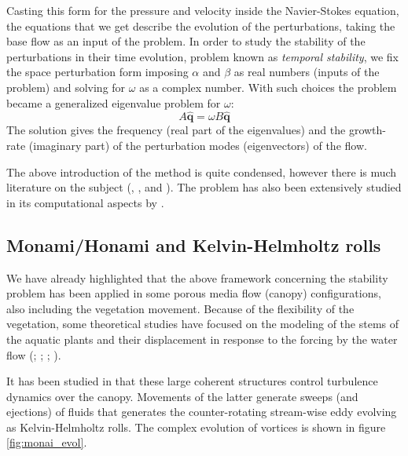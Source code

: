 Casting this form for the pressure and velocity inside the Navier-Stokes equation, the equations that we get describe the evolution of the perturbations, taking the base flow as an input of the problem.
In order to study the stability of the perturbations in their time evolution, problem known as \textit{temporal stability}, we fix the space perturbation form imposing $\alpha$ and $\beta$ as real numbers (inputs of the problem) and solving for $\omega$ as a complex number.
With such choices the problem became a generalized eigenvalue problem for $\omega$:
$$ A \widehat{\mathbf{q}} =  \omega B\widehat{\mathbf{q}} $$
The solution gives the frequency (real part of the eigenvalues) and the growth-rate (imaginary part) of the perturbation modes (eigenvectors) of the flow.

The above introduction of the method is quite condensed, however there is much literature on the subject (\citet{juniper2014modal}, \citet{criminale2003theory}, \citet{schmid2012stability} and \citet{ortiz2002spatial}). The problem has also been extensively studied in its computational aspects by \citet{canuto1988spectral}.

\subsection{Monami/Honami and Kelvin-Helmholtz rolls}

We have already highlighted that the above framework concerning the stability problem has been applied in some porous media flow (canopy) configurations, also including the vegetation movement.
Because of the flexibility of the vegetation, some theoretical studies have focused on the
modeling of the stems of the aquatic plants and their displacement in response to the forcing by the
water flow (\citet{py2004mixing}; \citet{patil2010characteristics}; \citet{gosselin2009destabilising}; \citet{py2006frequency}).

It has been studied in \citet{finnigan2000turbulence} that these large coherent structures control turbulence dynamics over the canopy. 
Movements of the latter generate sweeps (and ejections) of fluids that generates the counter-rotating stream-wise eddy evolving as Kelvin-Helmholtz rolls.
The complex evolution of vortices is shown in figure \ref{fig:monai_evol}.

